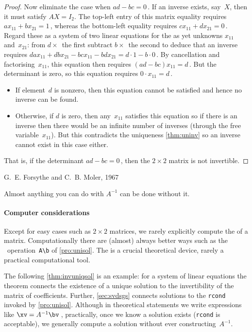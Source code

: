 \begin{proof}
Now eliminate the case when \(ad-bc=0\)\,.
If an inverse exists, say~\(X\), then it must satisfy \(AX=I_2\).
The top-left entry of this matrix equality requires \(ax_{11}+bx_{21}=1\)\,, whereas the bottom-left equality requires \(cx_{11}+dx_{21}=0\)\,.
Regard these as a system of two linear equations for the as yet unknowns \(x_{11}\) and~\(x_{21}\): from \(d\times\)~the first subtract \(b\times\)~the second to deduce that an inverse requires
\(dax_{11}+dbx_{21}-bcx_{11}-bdx_{21}=d\cdot1-b\cdot0\)\,.
By cancellation and factorising~\(x_{11}\), this equation then requires \((ad-bc)x_{11}=d\)\,.
But the determinant is zero, so this equation requires \(0\cdot x_{11}=d\)\,.
\begin{itemize}
\item If element~\(d\) is nonzero, then this equation cannot be satisfied and hence no inverse can be found.
\item Otherwise, if \(d\) is zero, then any~\(x_{11}\) satisfies this equation so if there is an inverse then there would be an infinite number of inverses (through the free variable~\(x_{11}\)).
But this contradicts the uniqueness \autoref{thm:uninv} so an inverse cannot exist in this case either.
\end{itemize}
That is, if the determinant \(ad-bc=0\)\,, then the \(2\times2\) matrix is not invertible.
\end{proof}



\begin{quoted}{\parbox[t]{0.5\linewidth}{G.~E. Forsythe and C.~B. Moler, 1967 \cite[p.261]{Higham1996}}}
Almost anything you can do with \(A^{-1}\) can be done without it.
\end{quoted}


\paragraph{Computer considerations} 
Except for easy cases such as \(2\times2\) matrices, we rarely explicitly compute the  of a matrix.
Computationally there are (almost) always better ways such as the \script\ operation~\verb|A\b| of \autoref{pro:unisol}.
The  is a crucial theoretical device, rarely a practical computational tool.


The following \autoref{thm:invuniqsol} is an example: for a system of linear equations the theorem connects the existence of a unique solution to the invertibility of the matrix of coefficients.
Further, \autoref{sec:svdsgs} connects solutions to the \verb|rcond| invoked by \autoref{pro:unisol}.
Although in theoretical statements we write expressions like \(\xv=A^{-1}\bv\)\,,
practically, once we know a solution exists (\verb|rcond| is acceptable), we generally compute a solution without ever constructing~\(A^{-1}\).



